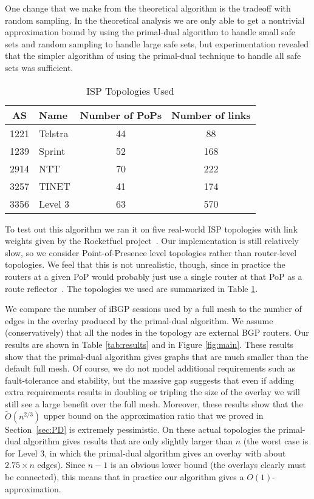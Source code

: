 \documentclass[11pt,letterpaper]{article}
\theoremstyle{definition}
\begin{document}
One change that we make from the theoretical algorithm is the tradeoff
with random sampling.  In the theoretical analysis we are only able to
get a nontrivial approximation bound by using the primal-dual
algorithm to handle small safe sets and random sampling to handle
large safe sets, but experimentation revealed that the simpler
algorithm of using the primal-dual technique to handle all safe sets
was sufficient.

\begin{table}
\begin{center}
\begin{tabular}{|c|l|c|c|}
\hline
AS & Name & Number of PoPs & Number of links\\
\hline
1221 & Telstra & 44 & 88 \\
1239 & Sprint & 52 & 168 \\
2914 & NTT & 70 & 222 \\
3257 & TINET & 41 & 174 \\
3356 & Level 3 & 63 & 570 \\
\hline
\end{tabular}
\end{center}
\caption{ISP Topologies Used}
\label{tab:topologies}
\end{table}

To test out this algorithm we ran it on five real-world ISP topologies
with link weights given by the Rocketfuel project~\cite{Rocketfuel04}.
Our implementation is still relatively slow, so we consider
Point-of-Presence level topologies rather than router-level
topologies.  We feel that this is not unrealistic, though, since in
practice the routers at a given PoP would probably just use a single
router at that PoP as a route reflector~\cite[Section
3.1]{POAMZ10}. The topologies we used are summarized in Table
\ref{tab:topologies}.

We compare the number of iBGP sessions used by a full mesh to the
number of edges in the overlay produced by the primal-dual algorithm.
We assume (conservatively) that all the nodes in the topology are
external BGP routers.  Our results are shown in Table
\ref{tab:results} and in Figure \ref{fig:main}.  These results show
that the primal-dual algorithm gives graphs that are much smaller than
the default full mesh.  Of course, we do not model additional
requirements such as fault-tolerance and stability, but the massive
gap suggests that even if adding extra requirements results in
doubling or tripling the size of the overlay we will still see a large
benefit over the full mesh.  Moreover, these results show that the
$\tilde{O}(n^{2/3})$ upper bound on the approximation ratio that we
proved in Section~\ref{sec:PD} is extremely pessimistic.  On these
actual topologies the primal-dual algorithm gives results that are
only slightly larger than $n$ (the worst case is for Level 3, in which
the primal-dual algorithm gives an overlay with about $2.75 \times n$
edges).  Since $n-1$ is an obvious lower bound (the overlays clearly
must be connected), this means that in practice our algorithm gives a
$O(1)$-approximation.
\end{document}
